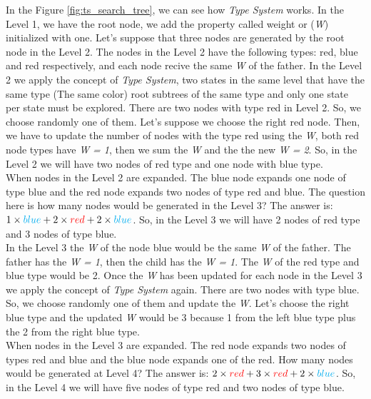 In the Figure \ref{fig:ts_search_tree}, we can see how \textit{Type System} works. In the Level 1, we have the root node, we add the property called weight or (\textit{W}) initialized with one. Let's suppose that three nodes are generated by the root node in the Level 2. The nodes in the Level 2 have the following types: red, blue and red respectively, and each node recive the same \textit{W} of the father. In the Level 2 we apply the concept of \textit{Type System}, two states in the same level that have the same type (The same color) root subtrees  of the same type and only one state per state must be explored. There are two nodes with type red in Level 2. So, we choose randomly one of them. Let's suppose we choose the right red node. Then, we have to update the number of nodes with the type red using the \textit{W}, both red node types have \textit{W = 1}, then we sum the \textit{W} and the the new \textit{W = 2}. So, in the Level 2 we will have two nodes of red type and one node with blue type. \\

When nodes in the Level 2 are expanded. The blue node expands one node of type blue and the red node expands two nodes of type red and blue. The question here is how many nodes would be generated in the Level 3? The answer is: $1 \times \textcolor{cyan}{blue} + 2 \times \textcolor{red}{red} + 2 \times \textcolor{cyan}{blue}$. So, in the Level 3 we will have 2 nodes of red type and 3 nodes of type blue. \\ 

In the Level 3 the \textit{W} of the node blue would be the same \textit{W} of the father. The father has the \textit{W = 1}, then the child has the \textit{W = 1}. The \textit{W} of the red type and blue type would be 2. Once the \textit{W} has been updated for each node in the Level 3 we apply the concept of \textit{Type System} again. There are two nodes with type blue. So, we choose randomly one of them and update the \textit{W}. Let's choose the right blue type and the updated \textit{W} would be 3 because 1 from the left blue type plus the 2 from the right blue type. \\

When nodes in the Level 3 are expanded. The red node expands two nodes of types red and blue and the blue node expands one of the red. How many nodes would be generated at Level 4? The answer is: $2 \times \textcolor{red}{red} + 3 \times \textcolor{red}{red} + 2 \times \textcolor{cyan}{blue}$. So, in the Level 4 we will have five nodes of type red and two nodes of type blue.\\

